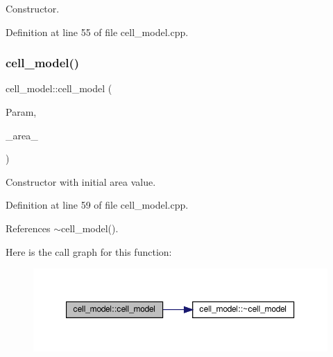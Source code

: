 Constructor. 



Definition at line 55 of file cell\+\_\+model.\+cpp.

\mbox{\label{classcell__model_a6ed4667f6abf28a4d0c2f1d261c50d64}} 
\subsubsection{\texorpdfstring{cell\+\_\+model()}{cell\_model()}\hspace{0.1cm}{\footnotesize\ttfamily [2/2]}}
{\footnotesize\ttfamily cell\+\_\+model\+::cell\+\_\+model (\begin{DoxyParamCaption}\item[{const \hyperlink{Parameter_8hpp_a37841774a6fcb479b597fdf8955eb4ea}{Parameter\+Const\+Ref} \&}]{Param,  }\item[{const double \&}]{\+\_\+area\+\_\+ }\end{DoxyParamCaption})}



Constructor with initial area value. 



Definition at line 59 of file cell\+\_\+model.\+cpp.



References $\sim$cell\+\_\+model().

Here is the call graph for this function\+:
\nopagebreak
\begin{figure}[H]
\begin{center}
\leavevmode
\includegraphics[width=350pt]{d6/dcd/classcell__model_a6ed4667f6abf28a4d0c2f1d261c50d64_cgraph}
\end{center}
\end{figure}
\mbox{\label{classcell__model_a24b20b8eba4c8f1da11d94c3b3d5c226}} 
